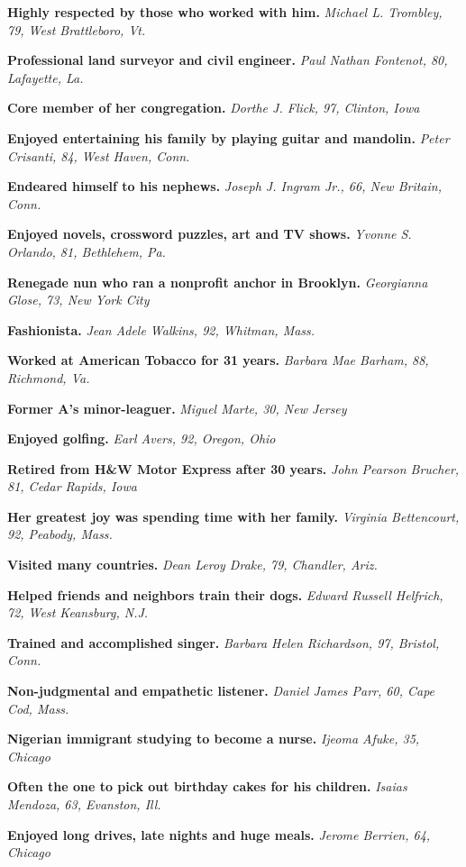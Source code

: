 \textbf{Highly respected by those who worked with him.} \emph{Michael L.
Trombley, 79, West Brattleboro, Vt.}

\textbf{Professional land surveyor and civil engineer.} \emph{Paul
Nathan Fontenot, 80, Lafayette, La.}

\textbf{Core member of her congregation.} \emph{Dorthe J. Flick, 97,
Clinton, Iowa}

\textbf{Enjoyed entertaining his family by playing guitar and mandolin.}
\emph{Peter Crisanti, 84, West Haven, Conn.}

\textbf{Endeared himself to his nephews.} \emph{Joseph J. Ingram Jr.,
66, New Britain, Conn.}

\textbf{Enjoyed novels, crossword puzzles, art and TV shows.}
\emph{Yvonne S. Orlando, 81, Bethlehem, Pa.}

\textbf{Renegade nun who ran a nonprofit anchor in Brooklyn.}
\emph{Georgianna Glose, 73, New York City}

\textbf{Fashionista.} \emph{Jean Adele Walkins, 92, Whitman, Mass.}

\textbf{Worked at American Tobacco for 31 years.} \emph{Barbara Mae
Barham, 88, Richmond, Va.}

\textbf{Former A's minor-leaguer.} \emph{Miguel Marte, 30, New Jersey}

\textbf{Enjoyed golfing.} \emph{Earl Avers, 92, Oregon, Ohio}

\textbf{Retired from H\&W Motor Express after 30 years.} \emph{John
Pearson Brucher, 81, Cedar Rapids, Iowa}

\textbf{Her greatest joy was spending time with her family.}
\emph{Virginia Bettencourt, 92, Peabody, Mass.}

\textbf{Visited many countries.} \emph{Dean Leroy Drake, 79, Chandler,
Ariz.}

\textbf{Helped friends and neighbors train their dogs.} \emph{Edward
Russell Helfrich, 72, West Keansburg, N.J.}

\textbf{Trained and accomplished singer.} \emph{Barbara Helen
Richardson, 97, Bristol, Conn.}

\textbf{Non-judgmental and empathetic listener.} \emph{Daniel James
Parr, 60, Cape Cod, Mass.}

\textbf{Nigerian immigrant studying to become a nurse.} \emph{Ijeoma
Afuke, 35, Chicago}

\textbf{Often the one to pick out birthday cakes for his children.}
\emph{Isaias Mendoza, 63, Evanston, Ill.}

\textbf{Enjoyed long drives, late nights and huge meals.} \emph{Jerome
Berrien, 64, Chicago}

